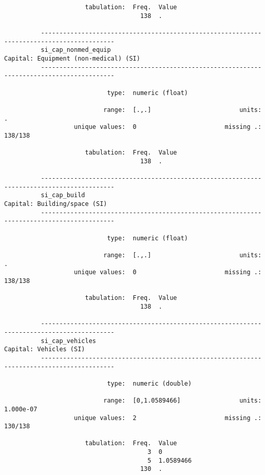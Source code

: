 \documentclass{article}
\begin{document}
\begin{verbatim}
                      tabulation:  Freq.  Value
                                     138  .
          
          ------------------------------------------------------------------------------------------
          si_cap_nonmed_equip                                  Capital: Equipment (non-medical) (SI)
          ------------------------------------------------------------------------------------------
          
                            type:  numeric (float)
          
                           range:  [.,.]                        units:  .
                   unique values:  0                        missing .:  138/138
          
                      tabulation:  Freq.  Value
                                     138  .
          
          ------------------------------------------------------------------------------------------
          si_cap_build                                                  Capital: Building/space (SI)
          ------------------------------------------------------------------------------------------
          
                            type:  numeric (float)
          
                           range:  [.,.]                        units:  .
                   unique values:  0                        missing .:  138/138
          
                      tabulation:  Freq.  Value
                                     138  .
          
          ------------------------------------------------------------------------------------------
          si_cap_vehicles                                                     Capital: Vehicles (SI)
          ------------------------------------------------------------------------------------------
          
                            type:  numeric (double)
          
                           range:  [0,1.0589466]                units:  1.000e-07
                   unique values:  2                        missing .:  130/138
          
                      tabulation:  Freq.  Value
                                       3  0
                                       5  1.0589466
                                     130  .
          

\end{verbatim}
\end{document}
